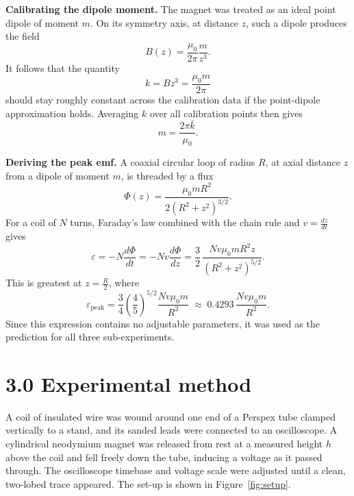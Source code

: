 \documentclass[11pt]{article}
\begin{document}
\textbf{Calibrating the dipole moment.} The magnet was treated as an ideal point dipole of moment $m$. On its symmetry axis, at distance $z$, such a dipole produces the field
\begin{equation}
B(z) = \frac{\mu_0}{2\pi} \frac{m}{z^3} .
\end{equation}
It follows that the quantity
\begin{equation}
k = Bz^3 = \frac{\mu_0 m}{2\pi}
\end{equation}
should stay roughly constant across the calibration data if the point-dipole approximation holds. Averaging $k$ over all calibration points then gives
\begin{equation}
m = \frac{2\pi \bar{k}}{\mu_0} .
\end{equation}

\textbf{Deriving the peak emf.} A coaxial circular loop of radius $R$, at axial distance $z$ from a dipole of moment $m$, is threaded by a flux
\begin{equation}
\Phi(z) = \frac{\mu_0 m R^2}{2(R^2 + z^2)^{3/2}} .
\end{equation}
For a coil of $N$ turns, Faraday's law combined with the chain rule and $v = \frac{dz}{dt}$ gives
\begin{equation}
\varepsilon = -N\frac{d\Phi}{dt} = -Nv\frac{d\Phi}{dz} = \frac{3}{2} \, \frac{Nv\mu_0 m R^2 z}{(R^2+z^2)^{5/2}} .
\end{equation}
This is greatest at $z = \frac{R}{2}$, where
\begin{equation}
\varepsilon_{\text{peak}} = \frac{3}{4}\left(\frac{4}{5}\right)^{5/2} \frac{Nv\mu_0 m}{R^2} \;\approx\; 0.4293\,\frac{Nv\mu_0 m}{R^2} .
\end{equation}
Since this expression contains no adjustable parameters, it was used as the prediction for all three sub-experiments.

\section*{3.0 Experimental method}

A coil of insulated wire was wound around one end of a Perspex tube clamped vertically to a stand, and its sanded leads were connected to an oscilloscope. A cylindrical neodymium magnet was released from rest at a measured height $h$ above the coil and fell freely down the tube, inducing a voltage as it passed through. The oscilloscope timebase and voltage scale were adjusted until a clean, two-lobed trace appeared. The set-up is shown in Figure~\ref{fig:setup}.
\end{document}
